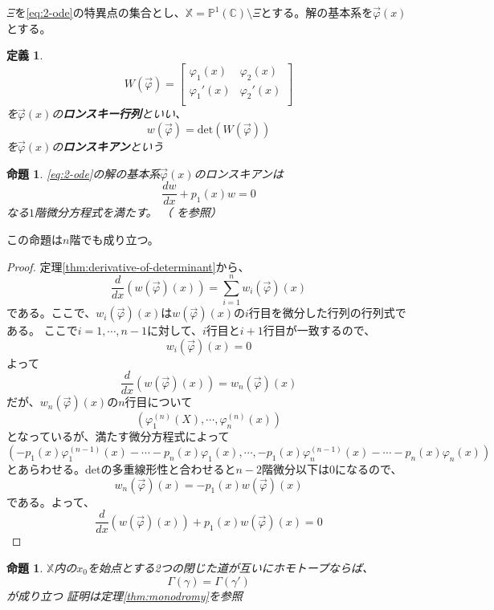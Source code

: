 \documentclass[paper=a4, fontsize=11pt]{jlreq} %
\theoremstyle{break}
\newtheorem{definition}[theorem]{定義}
\newtheorem{proposition}[theorem]{命題}
\theoremstyle{qa}
\theoremstyle{remark} %
\begin{document}



$\Xi$を\eqref{eq:2-ode}の特異点の集合とし、$\mathbb{X}=\mathbb{P}^{1}(\mathbb{C})\setminus\Xi$とする。解の基本系を$\vec{\varphi}(x)$とする。

\begin{definition}
    \[
    W(\vec{\varphi})=
    \left[
    \begin{matrix}
        \varphi_{1}(x) & \varphi_{2}(x) \\
        \varphi_{1}'(x) & \varphi_{2}'(x) \\
    \end{matrix}
    \right]
    \]
    を$\vec{\varphi}(x)$の\textbf{ロンスキー行列}といい、
    \[
    w(\vec{\varphi})=\text{det}(W(\vec{\varphi}))
    \]
    を$\vec{\varphi}(x)$の\textbf{ロンスキアン}という
\end{definition}

\begin{proposition}\label{prop:wronskian-ode}
    \eqref{eq:2-ode}の解の基本系$\vec{\varphi}(x)$のロンスキアンは
    \[
    \frac{dw}{dx}+p_{1}(x)w=0
    \]
    なる$1$階微分方程式を満たす。
    （\cite[p.51 命題2.2]{book:okamoto} を参照）
\end{proposition}

この命題は$n$階でも成り立つ。

\begin{proof}
    定理\ref{thm:derivative-of-determinant}から、
    \[
    \frac{d}{dx}(w(\vec{\varphi})(x))=\sum_{i=1}^{n}w_{i}(\vec{\varphi})(x)
    \]
    である。ここで、$w_{i}(\vec{\varphi})(x)$は$w(\vec{\varphi})(x)$の$i$行目を微分した行列の行列式である。
    ここで$i=1,\cdots,n-1$に対して、$i$行目と$i+1$行目が一致するので、
    \[
    w_{i}(\vec{\varphi})(x)=0
    \]
    よって
    \[
    \frac{d}{dx}(w(\vec{\varphi})(x))=w_{n}(\vec{\varphi})(x)
    \]
    だが、$w_{n}(\vec{\varphi})(x)$の$n$行目について
    \[
    (\varphi_{1}^{(n)}(X),\cdots,\varphi_{n}^{(n)}(x))
    \]
    となっているが、満たす微分方程式によって
    \[
    (-p_{1}(x)\varphi_{1}^{(n-1)}(x)-\cdots-p_{n}(x)\varphi_{1}(x),\cdots,-p_{1}(x)\varphi_{n}^{(n-1)}(x)-\cdots-p_{n}(x)\varphi_{n}(x))
    \]
    とあらわせる。detの多重線形性と合わせると$n-2$階微分以下は0になるので、
    \[
    w_{n}(\vec{\varphi})(x)=-p_{1}(x)w(\vec{\varphi})(x)
    \]
    である。よって、
    \[
    \frac{d}{dx}(w(\vec{\varphi})(x))+p_{1}(x)w(\vec{\varphi})(x)=0
    \]
\end{proof}

\begin{proposition}
$\mathbb{X}$内の$x_{0}$を始点とする2つの閉じた道が互いにホモトープならば、
\[
\Gamma(\gamma)=\Gamma(\gamma ')
\]
が成り立つ
証明は定理\ref{thm:monodromy}を参照
\end{proposition}
\end{document}
